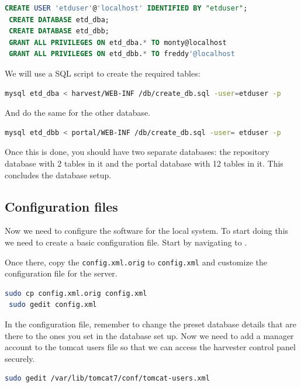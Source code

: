 \documentclass[a4paper,11pt]{article}
\begin{document}
\begin{lstlisting}[language=SQL]
 CREATE USER 'etduser'@'localhost' IDENTIFIED BY "etduser"; 
 CREATE DATABASE etd_dba; 
 CREATE DATABASE etd_dbb; 
 GRANT ALL PRIVILEGES ON etd_dba.* TO monty@localhost 
 GRANT ALL PRIVILEGES ON etd_dbb.* TO freddy'@localhost
\end{lstlisting}

We will use a SQL script to create the required tables: 

\begin{lstlisting}[language=bash]
 mysql etd_dba < harvest/WEB-INF /db/create_db.sql -user=etduser -p
\end{lstlisting}

And do the same for the other database. 

\begin{lstlisting}[language=bash]
 mysql etd_dbb < portal/WEB-INF /db/create_db.sql -user= etduser -p
\end{lstlisting}

Once this is done, you should have two separate databases: the repository database with 2 tables in it and the portal database with 12 tables in it. This concludes the database setup.

\subsection{Configuration files}

Now we need to configure the software for the local system. To start doing this we need to create a basic configuration file. Start by navigating to .

Once there, copy the \texttt{config.xml.orig} to \texttt{config.xml} and customize the configuration file for the server. 

\begin{lstlisting}[language=bash]
 sudo cp config.xml.orig config.xml 
 sudo gedit config.xml
\end{lstlisting}

In the configuration file, remember to change the preset database details that are there to the ones you set in the database set up. Now we need to add a manager account to the tomcat users file so that we can access the harvester control panel securely. 

\begin{lstlisting}[language=bash]
 sudo gedit /var/lib/tomcat7/conf/tomcat-users.xml
\end{lstlisting}
\end{document}
